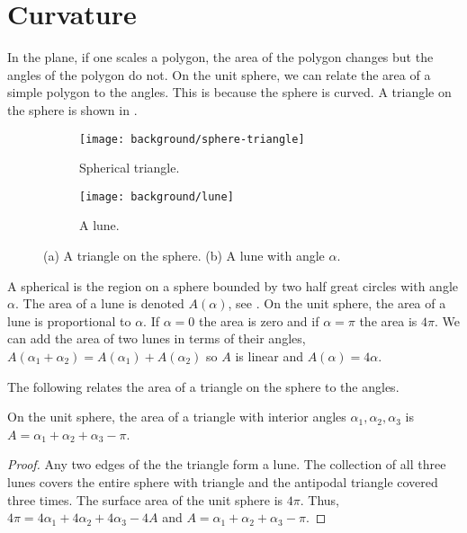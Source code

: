 \section{Curvature}

In the plane, if one scales a polygon, the area of the polygon changes
but the angles of the polygon do not.
On the unit sphere, we can relate the area of a simple polygon 
to the angles. This is because the sphere is curved.
A triangle on the sphere is shown in .


 \begin{figure}[htb]
         \centering
        \begin{subfigure}[b]{0.35\textwidth}
         \texttt{[image: background/sphere-triangle]}
         \caption{Spherical triangle.}
 	 \label{fig:sphere-triangle}
       \end{subfigure}
         \hspace{1cm}
         \begin{subfigure}[b]{0.35\textwidth}
         \texttt{[image: background/lune]}
         \caption{A lune.}
          \label{fig:lune}
         \end{subfigure}
		\caption{(a) A triangle on the sphere.
 		(b) A lune with angle $\alpha$.
 		\label{fig:sphere-lune}}
 \end{figure}
A spherical  is the region on a sphere bounded by two half great circles
with angle $\alpha$. The area of a lune is denoted $A(\alpha)$,
 see .
On the unit sphere, the area of a lune is proportional to $\alpha$. 
If $\alpha=0$ the area is zero and if $\alpha=\pi$ the area is $4\pi$.
We can add the area of two lunes in terms of their angles, 
$A(\alpha_1+\alpha_2)=A(\alpha_1)+A(\alpha_2)$ so $A$ is linear
and  $A(\alpha)=4\alpha.$




The following relates the area of a triangle on the sphere to the angles.

\begin{lemma}\label{lem:spherical-triangle}
On the unit sphere, the area of a triangle with interior angles $\alpha_1, \alpha_2, \alpha_3$
is $A=\alpha_1+\alpha_2+\alpha_3-\pi$.
\end{lemma}

\begin{proof}
	Any two edges of the the triangle form a lune. The collection of 
	all three lunes covers the entire sphere with triangle and the antipodal triangle covered three times.
 	The surface area of the unit sphere is $4\pi$.
	Thus, $4\pi=4\alpha_1+4\alpha_2+4\alpha_3-4A$
	and $A=\alpha_1+\alpha_2+\alpha_3-\pi$.
\end{proof}


